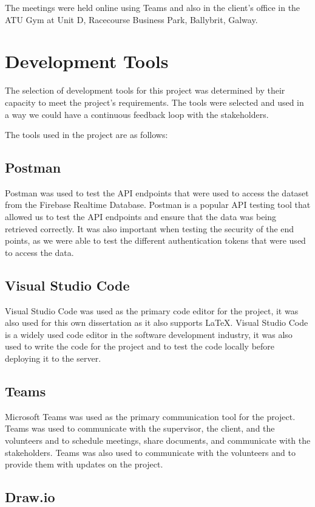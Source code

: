 The meetings were held online using Teams and also in the client's office in the ATU Gym at Unit D, Racecourse Business Park, Ballybrit, Galway. 

\section{Development Tools}
The selection of development tools for this project was determined by their capacity to meet the project's requirements.
The tools were selected and used in a way we could have a continuous feedback loop with the stakeholders.

The tools used in the project are as follows:

\subsection{Postman}
Postman was used to test the API endpoints that were used to access the dataset from the Firebase Realtime Database. Postman is a popular API testing tool
that allowed us to test the API endpoints and ensure that the data was being retrieved correctly. It was also important when testing the security of the end points, 
as we were able to test the different authentication tokens that were used to access the data.

\subsection{Visual Studio Code}
Visual Studio Code was used as the primary code editor for the project, it was also used for this own dissertation as it also supports \LaTeX. Visual Studio Code 
is a widely used code editor in the software development industry, it was also used to write the code for the project and to test the 
code locally before deploying it to the server.

\subsection{Teams}
Microsoft Teams was used as the primary communication tool for the project. Teams was used to communicate with the supervisor, the client, and the volunteers and to 
schedule meetings, share documents, and communicate with the stakeholders. Teams was also used to communicate with the volunteers and to provide them
with updates on the project. 

\subsection{Draw.io}

